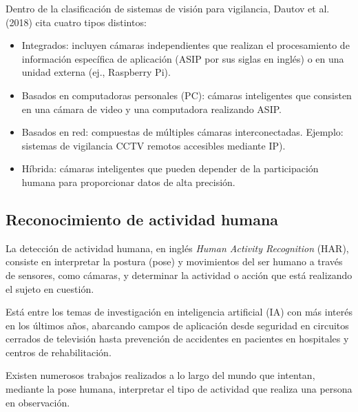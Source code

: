 \documentclass[a4paper,12pt,oneside,spanish]{book}
\begin{document}
Dentro de la clasificación de sistemas de visión para vigilancia, Dautov et al. (2018) \cite{dautov} cita cuatro tipos distintos:
\begin{itemize}
	\setlength\itemsep{-1.2em}
	\item Integrados: incluyen cámaras independientes que realizan el procesamiento de información específica de aplicación (ASIP por sus siglas en inglés) o en una unidad externa (ej., Raspberry Pi).\\	
	\item Basados en computadoras personales (PC): cámaras inteligentes que consisten en una cámara de video y una computadora  realizando ASIP.\\	
	\item Basados en red: compuestas de múltiples cámaras interconectadas. Ejemplo: sistemas de vigilancia CCTV remotos accesibles mediante IP).\\	
	\item Híbrida: cámaras inteligentes que pueden depender de la participación humana para proporcionar datos de alta precisión.\\	
\end{itemize}

\subsection{Reconocimiento de actividad humana}

La detección de actividad humana, en inglés \textit{Human Activity Recognition} (HAR), consiste en interpretar la postura (pose) y movimientos del ser humano a través de sensores, como cámaras, y determinar la actividad o acción que está realizando el sujeto en cuestión.\par

Está entre los temas de investigación en inteligencia artificial (IA) con más interés en los últimos años, abarcando campos de aplicación  desde seguridad en circuitos cerrados de televisión hasta prevención de accidentes en pacientes en hospitales y centros de rehabilitación.\par

Existen numerosos trabajos realizados a lo largo del mundo que intentan, mediante la pose humana, interpretar el tipo de actividad que realiza una persona en observación. \par
\end{document}
